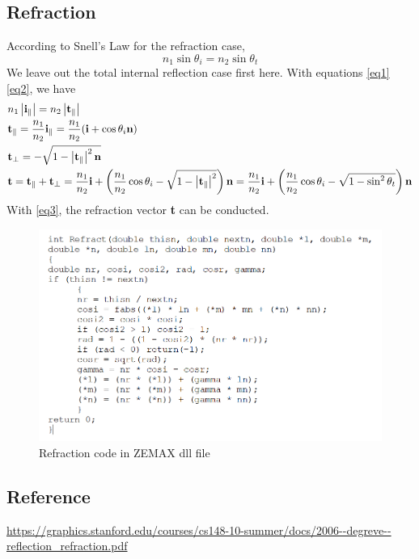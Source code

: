\documentclass[../main.tex]{subfiles}
\begin{document}
	\subsection{Refraction}
	According to Snell's Law for the refraction case,
	\begin{equation}
	n_1\sin\theta_i=n_2\sin\theta_t\label{eq3}
	\end{equation}
	We leave out the total internal reflection case first here. With equations \ref{eq1} \ref{eq2}, we have
	\begin{align}
	&n_1\left\lvert\textbf{i}_{\parallel}\right\rvert=n_2\left\lvert\textbf{t}_{\parallel}\right\rvert\\
	&\textbf{t}_{\parallel}=\frac{n_1}{n_2}{\textbf{i}_{\parallel}}=\frac{n_1}{n_2}(\textbf{i}+\cos\theta_i\textbf{n})\\
	&\textbf{t}_{\perp}=-\sqrt{1-\left\lvert\textbf{t}_{\parallel}\right\rvert^2\textbf{n}}\\
	&\textbf{t}=\textbf{t}_{\parallel}+\textbf{t}_{\perp}=\frac{n_1}{n_2}\textbf{i}+\left(\frac{n_1}{n_2}\cos\theta_i-\sqrt{1-\left\lvert\textbf{t}_{\parallel}\right\rvert^2}\right)\textbf{n}=\frac{n_1}{n_2}\textbf{i}+\left(\frac{n_1}{n_2}\cos\theta_i-\sqrt{1-\sin^2\theta_t}\right)\textbf{n}
	\end{align}
	With \ref{eq3}, the refraction vector \textbf{t} can be conducted.
	\begin{figure}[h!]
	  \centering
	  \includegraphics[scale=0.5]{../graphics/Ray_tracing2.png}
	  \caption{Refraction code in ZEMAX dll file}
	  \label{fig:Refraction}
	\end{figure}	
	\subsection{Reference}
	\url{https://graphics.stanford.edu/courses/cs148-10-summer/docs/2006--degreve--reflection_refraction.pdf}
\end{document}

